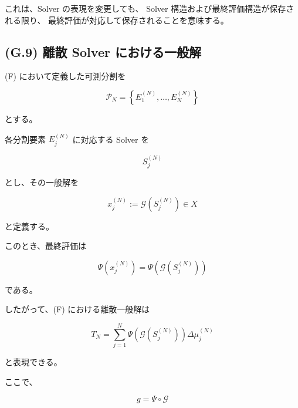 \documentclass[a4paper,11pt]{article}
\begin{document}
これは、Solver の表現を変更しても、
Solver 構造および最終評価構造が保存される限り、
最終評価が対応して保存されることを意味する。


\subsection{(G.9) 離散 Solver における一般解}
\label{subsec:G9}

(F) において定義した可測分割を

\begin{equation}
    \mathcal{P}_N
    =
    \left\{
        E_1^{(N)},
        \ldots,
        E_N^{(N)}
    \right\}
\end{equation}

とする。

各分割要素 $E_j^{(N)}$ に対応する Solver を

\begin{equation}
    S_j^{(N)}
\end{equation}

とし、その一般解を

\begin{equation}
    x_j^{(N)}
    :=
    \mathcal{G}\!\left(S_j^{(N)}\right)
    \in X
\end{equation}

と定義する。

このとき、最終評価は

\begin{equation}
    \Psi\!\left(
        x_j^{(N)}
    \right)
    =
    \Psi\!\left(
        \mathcal{G}\!\left(S_j^{(N)}\right)
    \right)
\end{equation}

である。

したがって、(F) における離散一般解は

\begin{equation}
    \boxed{
        T_N
        =
        \sum_{j=1}^{N}
        \Psi\!\left(
            \mathcal{G}\!\left(S_j^{(N)}\right)
        \right)
        \Delta\mu_j^{(N)}
    }
    \label{eq:G-discrete-general-solution}
\end{equation}

と表現できる。

ここで、

\begin{equation}
    g
    =
    \Psi\circ\mathcal{G}
\end{equation}
\end{document}
